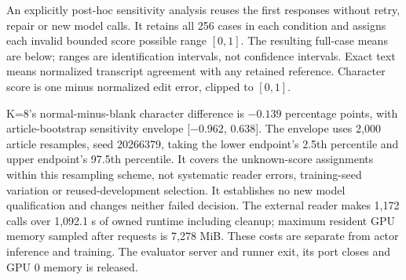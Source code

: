 \documentclass[10pt,a4paper]{article}
\begin{document}
An explicitly post-hoc sensitivity analysis reuses the first responses
without retry, repair or new model calls. It retains all 256 cases in each
condition and assigns each invalid bounded score possible range $[0,1]$.
The resulting full-case means are below; ranges are identification intervals,
not confidence intervals. Exact text means normalized transcript agreement
with any retained reference. Character score is one minus normalized edit
error, clipped to $[0,1]$.

K=8's normal-minus-blank character difference is $-0.139$ percentage points,
with article-bootstrap sensitivity envelope [$-0.962$, 0.638]. The envelope
uses 2,000 article resamples, seed 20266379, taking the lower endpoint's
2.5th percentile and upper endpoint's 97.5th percentile. It covers the
unknown-score assignments within this resampling scheme, not systematic
reader errors, training-seed variation or reused-development selection.
It establishes no new model qualification and changes neither failed decision.
The external reader makes 1,172 calls over 1,092.1 s of owned runtime including
cleanup; maximum resident GPU memory sampled after requests is 7,278 MiB.
These costs are separate from actor inference and training. The evaluator
server and runner exit, its port closes and GPU 0 memory is released.
\end{document}
